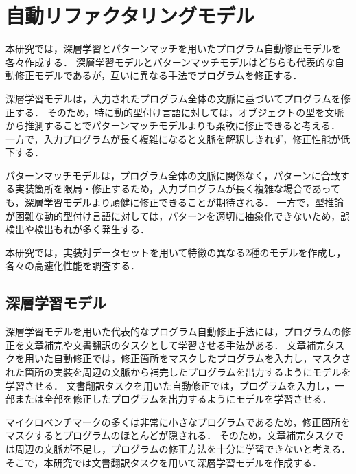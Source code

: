 \documentclass[11pt]{jreport}
\begin{document}


\chapter{自動リファクタリングモデル}\label{chapter:model}


本研究では，深層学習とパターンマッチを用いたプログラム自動修正モデルを各々作成する．
深層学習モデルとパターンマッチモデルはどちらも代表的な自動修正モデルであるが，互いに異なる手法でプログラムを修正する．

深層学習モデルは，入力されたプログラム全体の文脈に基づいてプログラムを修正する．
そのため，特に動的型付け言語に対しては，オブジェクトの型を文脈から推測することでパターンマッチモデルよりも柔軟に修正できると考える．
一方で，入力プログラムが長く複雑になると文脈を解釈しきれず，修正性能が低下する．

パターンマッチモデルは，プログラム全体の文脈に関係なく，パターンに合致する実装箇所を限局・修正するため，入力プログラムが長く複雑な場合であっても，深層学習モデルより頑健に修正できることが期待される．
一方で，型推論が困難な動的型付け言語に対しては，パターンを適切に抽象化できないため，誤検出や検出もれが多く発生する．

本研究では，実装対データセットを用いて特徴の異なる2種のモデルを作成し，各々の高速化性能を調査する．




\section{深層学習モデル}


深層学習モデルを用いた代表的なプログラム自動修正手法には，プログラムの修正を文章補完や文書翻訳のタスクとして学習させる手法がある．
文章補完タスクを用いた自動修正では，修正箇所をマスクしたプログラムを入力し，マスクされた箇所の実装を周辺の文脈から補完したプログラムを出力するようにモデルを学習させる．
文書翻訳タスクを用いた自動修正では，プログラムを入力し，一部または全部を修正したプログラムを出力するようにモデルを学習させる．

マイクロベンチマークの多くは非常に小さなプログラムであるため，修正箇所をマスクするとプログラムのほとんどが隠される．
そのため，文章補完タスクでは周辺の文脈が不足し，プログラムの修正方法を十分に学習できないと考える．
そこで，本研究では文書翻訳タスクを用いて深層学習モデルを作成する．
\end{document}
